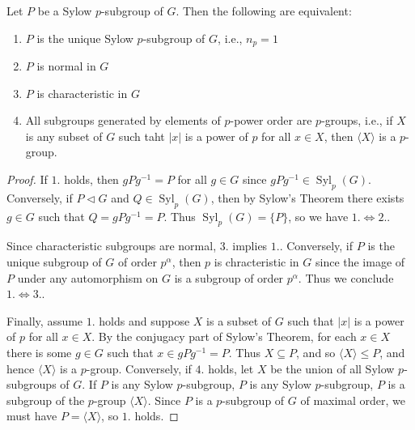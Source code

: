 \documentclass[12pt, a4paper, oneside, openright, titlepage]{book}
\begin{document}
\begin{cor}
    Let $P$ be a Sylow $p$-subgroup of $G$. Then the following are equivalent: \begin{enumerate}
        \item $P$ is the unique Sylow $p$-subgroup of $G$, i.e., $n_p = 1$
        \item $P$ is normal in $G$
        \item $P$ is characteristic in $G$
        \item All subgroups generated by elements of $p$-power order are $p$-groups, i.e., if $X$ is any subset of $G$ such taht $|x|$ is a power of $p$ for all $x \in X$, then $\langle X \rangle$ is a $p$-group.
    \end{enumerate}
\end{cor}
\begin{proof}
    If $1.$ holds, then $gPg^{-1} = P$ for all $g \in G$ since $gPg^{-1} \in \operatorname{Syl}_p(G)$. Conversely, if $P \vartriangleleft G$ and $Q \in \operatorname{Syl}_p(G)$, then by Sylow's Theorem there exists $g \in G$ such that $Q = gPg^{-1} = P$. Thus $\operatorname{Syl}_p(G) = \{P\}$, so we have $1. \iff 2.$.

    Since characteristic subgroups are normal, $3.$ implies $1.$. Conversely, if $P$ is the unique subgroup of $G$ of order $p^{\alpha}$, then $p$ is chracteristic in $G$ since the image of $P$ under any automorphism on $G$ is a subgroup of order $p^{\alpha}$. Thus we conclude $1.\iff 3.$.

    Finally, assume $1.$ holds and suppose $X$ is a subset of $G$ such that $|x|$ is a power of $p$ for all $x \in X$. By the conjugacy part of Sylow's Theorem, for each $x \in X$ there is some $g \in G$ such that $x \in gPg^{-1} = P$. Thus $X \subseteq P$, and so $\langle X\rangle \leq P$, and hence $\langle X\rangle$ is a $p$-group. Conversely, if $4.$ holds, let $X$ be the union of all Sylow $p$-subgroups of $G$. If $P$ is any Sylow $p$-subgroup, $P$ is any Sylow $p$-subgroup, $P$ is a subgroup of the $p$-group $\langle X\rangle$. Since $P$ is a $p$-subgroup of $G$ of maximal order, we must have $P = \langle X\rangle$, so $1.$ holds.
\end{proof}
\end{document}
